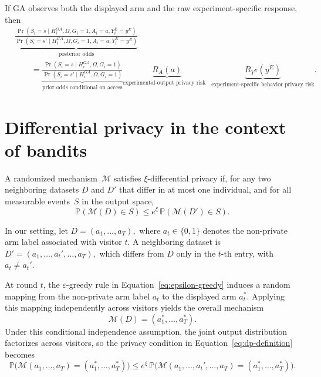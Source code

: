 \documentclass[mksc,nonblindrev]{informs3}
\begin{document}
\begin{APPENDICES}
If GA observes both the displayed arm and the raw experiment-specific response, then
\[
\begin{aligned}
&\underbrace{
\frac{
\Pr(S_i=s\mid H_i^{GA},\Omega,G_i=1,A_i=a,Y_i^E=y^E)
}{
\Pr(S_i=s'\mid H_i^{GA},\Omega,G_i=1,A_i=a,Y_i^E=y^E)
}
}_{\text{posterior odds}}
\\[0.75em]
&\qquad =
\underbrace{
\frac{
\Pr(S_i=s\mid H_i^{GA},\Omega,G_i=1)
}{
\Pr(S_i=s'\mid H_i^{GA},\Omega,G_i=1)
}
}_{\text{prior odds conditional on access}}
\underbrace{R_A(a)}_{\text{experimental-output privacy risk}\quad}
\underbrace{R_{Y^E}(y^E)}_{\text{experiment-specific behavior privacy risk}}.
\end{aligned}
\]


\section{Differential privacy in the context of bandits}
\label{sec:dp-bandits}

A randomized mechanism~$\mathcal{M}$ satisfies $\xi$-differential privacy if, for any two neighboring datasets $D$ and $D'$ that differ in at most one individual, and for all measurable events~$S$ in the output space,
\begin{equation}\label{eq:dp-definition}
\mathbb{P}(\mathcal{M}(D)\in S)
\le e^{\xi}\,\mathbb{P}(\mathcal{M}(D')\in S).
\end{equation}

In our setting, let $D=(a_1,\dots,a_T),$ where $a_t\in\{0,1\}$ denotes the non-private arm label associated with visitor $t$. A neighboring dataset is $D'=(a_1,\dots,a_t',\dots,a_T),$ which differs from $D$ only in the $t$-th entry, with $a_t\neq a_t'$.

At round $t$, the $\varepsilon$-greedy rule in Equation~\eqref{eq:epsilon-greedy} induces a random mapping from the non-private arm label $a_t$ to the displayed arm $a_t^*$. Applying this mapping independently across visitors yields the overall mechanism
\[
\mathcal{M}(D)=(a_1^*,\dots,a_T^*).
\]
Under this conditional independence assumption, the joint output distribution factorizes across visitors, so the privacy condition in Equation~\eqref{eq:dp-definition} becomes
\begin{equation}\label{eq:dp-joint}
\mathbb{P}\big(\mathcal{M}(a_1,\dots,a_T)=(a_1^*,\dots,a_T^*)\big)
\le e^{\xi}\,
\mathbb{P}\big(\mathcal{M}(a_1,\dots,a_t',\dots,a_T)=(a_1^*,\dots,a_T^*)\big).
\end{equation}


\end{APPENDICES}
\end{document}
